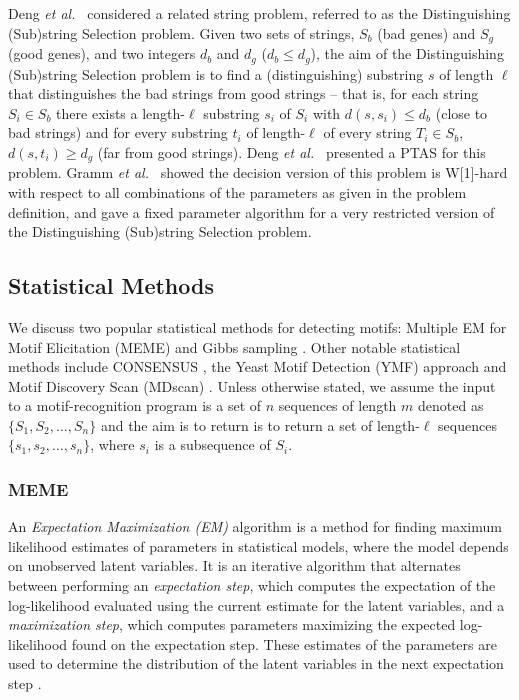 Deng {\em et al.}~\cite{DLLM} considered a related string problem, referred to as the {\sc Distinguishing (Sub)string Selection} problem. Given two sets of strings, $S_b$ (bad genes) and $S_g$ (good genes), and two integers $d_b$ and $d_g$ ($d_b \leq d_g$), the aim of the {\sc Distinguishing (Sub)string Selection} problem is to find a (distinguishing) substring $s$ of length $\ell$ that distinguishes the bad strings from good strings -- that is, for each string $S_i \in S_b$ there exists a length-$\ell$ substring $s_i$ of $S_i$ with $d(s, s_i) \leq d_b$ (close to bad strings) and for every substring $t_i$ of length-$\ell$ of every string $T_i \in S_b$, $d(s, t_i) \geq d_g$ (far from good strings). Deng {\em et al.}~\cite{DLLM} presented a PTAS for this problem. Gramm {\em et al.}~\cite{GGN,GGN06} showed the decision version of this problem is W[1]-hard with respect to all combinations of the parameters as given in the problem definition, and gave a fixed parameter algorithm for a very restricted version of the {\sc Distinguishing (Sub)string Selection} problem.

\subsection{Statistical Methods}


We discuss two popular statistical methods for detecting motifs: Multiple EM for Motif Elicitation (MEME) \cite{BE95} and Gibbs sampling \cite{LABLNW}. Other notable statistical methods include CONSENSUS \cite{HS}, the Yeast Motif Detection (YMF) approach \cite{ST03} and Motif Discovery Scan (MDscan) \cite{LBL02}.  Unless otherwise stated, we assume the input to a motif-recognition program is a set of $n$ sequences of length $m$ denoted as $\{S_1, S_2, \ldots, S_n\}$ and the aim is to return is to return a set of length-$\ell$ sequences $\{s_1, s_2, \ldots, s_n\}$, where $s_i$ is a subsequence of $S_i$.

\subsubsection{MEME} 

An {\em Expectation Maximization (EM)} algorithm is a method for finding maximum likelihood estimates of parameters in statistical models, where the model depends on unobserved latent variables. It is an iterative algorithm that alternates between performing an {\em expectation step}, which computes the expectation of the log-likelihood evaluated using the current estimate for the latent variables, and a {\em maximization step}, which computes parameters maximizing the expected log-likelihood found on the expectation step. These estimates of the parameters are used to determine the distribution of the latent variables in the next expectation step \cite{haeseleer}.  

